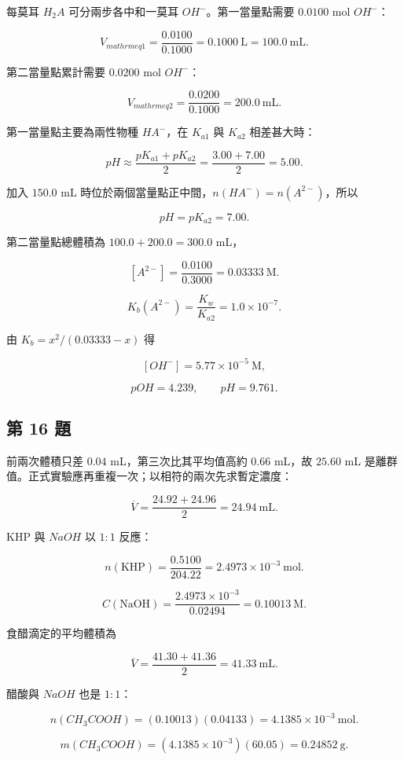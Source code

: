 \documentclass[11pt,a4paper]{article}
\begin{document}
每莫耳 \(H_2A\) 可分兩步各中和一莫耳 \(OH^-\)。第一當量點需要 \(0.0100\) mol \(OH^-\)：

\[
V_{mathrm{eq1}}=\frac{0.0100}{0.1000}=0.1000\ \mathrm L
=100.0\ \mathrm{mL}.
\]

第二當量點累計需要 \(0.0200\) mol \(OH^-\)：

\[
V_{mathrm{eq2}}=\frac{0.0200}{0.1000}=200.0\ \mathrm{mL}.
\]

第一當量點主要為兩性物種 \(HA^-\)，在 \(K_{a1}\) 與 \(K_{a2}\) 相差甚大時：

\[
pH\approx\frac{pK_{a1}+pK_{a2}}{2}
=\frac{3.00+7.00}{2}=5.00.
\]

加入 \(150.0\) mL 時位於兩個當量點正中間，\(n(HA^-)=n(A^{2-})\)，所以

\[
pH=pK_{a2}=7.00.
\]

第二當量點總體積為 \(100.0+200.0=300.0\) mL，

\[
[A^{2-}]=\frac{0.0100}{0.3000}=0.03333\ \mathrm M.
\]

\[
K_b(A^{2-})=\frac{K_w}{K_{a2}}=1.0\times10^{-7}.
\]

由 \(K_b=x^2/(0.03333-x)\) 得

\[
[OH^-]=5.77\times10^{-5}\ \mathrm M,
\]

\[
pOH=4.239,\qquad pH=9.761.
\]

\subsection{第 16 題}\label{ux7b2c-16-ux984c}

前兩次體積只差 \(0.04\) mL，第三次比其平均值高約 \(0.66\) mL，故 \(25.60\) mL 是離群值。正式實驗應再重複一次；以相符的兩次先求暫定濃度：

\[
\overline V=\frac{24.92+24.96}{2}=24.94\ \mathrm{mL}.
\]

KHP 與 \(NaOH\) 以 \(1:1\) 反應：

\[
n(\mathrm{KHP})=\frac{0.5100}{204.22}
=2.4973\times10^{-3}\ \mathrm{mol}.
\]

\[
C(\mathrm{NaOH})=
\frac{2.4973\times10^{-3}}{0.02494}
=0.10013\ \mathrm M.
\]

食醋滴定的平均體積為

\[
\overline V=\frac{41.30+41.36}{2}=41.33\ \mathrm{mL}.
\]

醋酸與 \(NaOH\) 也是 \(1:1\)：

\[
n(CH_3COOH)=(0.10013)(0.04133)
=4.1385\times10^{-3}\ \mathrm{mol}.
\]

\[
m(CH_3COOH)=(4.1385\times10^{-3})(60.05)
=0.24852\ \mathrm g.
\]
\end{document}
